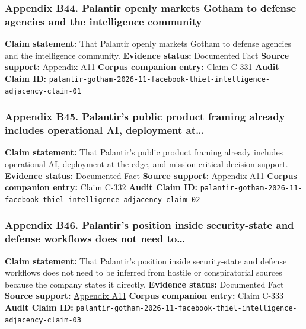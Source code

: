 \documentclass[
  american,
  11pt,
  letterpaper,
]{article}
\begin{document}
\subsubsection{Appendix B44. Palantir openly markets Gotham to defense
agencies and the intelligence
community}\label{ch-07-appendix-b44-palantir-openly-markets-gotham-to-defense-agencies-and-the-intelligence-community}

\textbf{Claim statement:} That Palantir openly markets Gotham to defense
agencies and the intelligence community. \textbf{Evidence status:}
Documented Fact \textbf{Source support:}
\hyperref[ch-07-appendix-a11-gotham]{Appendix A11} \textbf{Corpus
companion entry:} Claim C-331 \textbf{Audit Claim ID:}
\texttt{palantir-gotham-2026-11-facebook-thiel-intelligence-adjacency-claim-01}

\subsubsection{Appendix B45. Palantir's public product framing already
includes operational AI, deployment
at\ldots{}}\label{ch-07-appendix-b45-palantir-s-public-product-framing-already-includes-operational-ai-deployment-at}

\textbf{Claim statement:} That Palantir's public product framing already
includes operational AI, deployment at the edge, and mission-critical
decision support. \textbf{Evidence status:} Documented Fact
\textbf{Source support:} \hyperref[ch-07-appendix-a11-gotham]{Appendix
A11} \textbf{Corpus companion entry:} Claim C-332 \textbf{Audit Claim
ID:}
\texttt{palantir-gotham-2026-11-facebook-thiel-intelligence-adjacency-claim-02}

\subsubsection{Appendix B46. Palantir's position inside security-state
and defense workflows does not need
to\ldots{}}\label{ch-07-appendix-b46-palantir-s-position-inside-security-state-and-defense-workflows-does-not-need-to}

\textbf{Claim statement:} That Palantir's position inside security-state
and defense workflows does not need to be inferred from hostile or
conspiratorial sources because the company states it directly.
\textbf{Evidence status:} Documented Fact \textbf{Source support:}
\hyperref[ch-07-appendix-a11-gotham]{Appendix A11} \textbf{Corpus
companion entry:} Claim C-333 \textbf{Audit Claim ID:}
\texttt{palantir-gotham-2026-11-facebook-thiel-intelligence-adjacency-claim-03}
\end{document}
